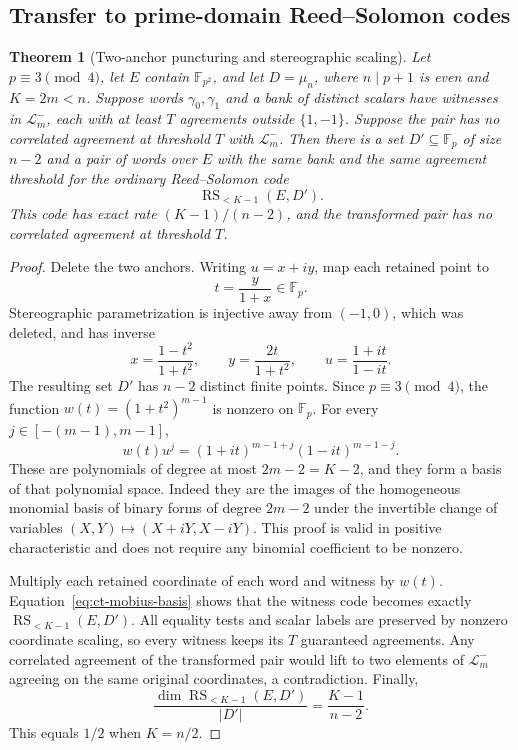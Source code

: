 \documentclass[11pt,letterpaper]{article}
\newtheorem{theorem}{Theorem}[section]
\theoremstyle{definition}
\theoremstyle{remark}
\begin{document}
\subsection{Transfer to prime-domain Reed--Solomon codes}
\label{sec:ct-stereographic}

\begin{theorem}[Two-anchor puncturing and stereographic scaling]
\label{thm:ct-transfer}
Let $p\equiv3\pmod4$, let $E$ contain $\mathbb F_{p^2}$, and let
$D=\mu_n$, where $n\mid p+1$ is even and $K=2m<n$. Suppose words $\gamma_0,\gamma_1$ and a bank
of distinct scalars have witnesses in $\mathcal L^-_m$, each with at
least $T$ agreements outside $\{1,-1\}$. Suppose the pair has no
correlated agreement at threshold $T$ with $\mathcal L^-_m$.
Then there is a set $D'\subseteq\mathbb F_p$ of size $n-2$ and a pair
of words over $E$ with the same bank and the same agreement threshold
for the ordinary Reed--Solomon code
\[
 \operatorname{RS}_{<K-1}(E,D').
\]
This code has exact rate $(K-1)/(n-2)$, and the transformed pair has no
correlated agreement at threshold $T$.
\end{theorem}

\begin{proof}
Delete the two anchors. Writing $u=x+iy$, map each retained point to
\[
 t=\frac{y}{1+x}\in\mathbb F_p.
\]
Stereographic parametrization is injective away from $(-1,0)$, which was
deleted, and has inverse
\[
 x=\frac{1-t^2}{1+t^2},\qquad
 y=\frac{2t}{1+t^2},\qquad
 u=\frac{1+it}{1-it}.
\]
The resulting set $D'$ has $n-2$ distinct finite points. Since $p\equiv3
\pmod4$, the function $w(t)=(1+t^2)^{m-1}$ is nonzero on $\mathbb F_p$.
For every $j\in[-(m-1),m-1]$,
\begin{equation}\label{eq:ct-mobius-basis}
 w(t)u^j=(1+it)^{m-1+j}(1-it)^{m-1-j}.
\end{equation}
These are polynomials of degree at most $2m-2=K-2$, and they form a
basis of that polynomial space. Indeed they are the images of the
homogeneous monomial basis of binary forms of degree $2m-2$ under the
invertible change of variables $(X,Y)\mapsto(X+iY,X-iY)$. This proof is
valid in positive characteristic and does not require any binomial
coefficient to be nonzero.

Multiply each retained coordinate of each word and witness by $w(t)$.
Equation~\eqref{eq:ct-mobius-basis} shows that the witness code becomes
exactly $\operatorname{RS}_{<K-1}(E,D')$. All equality tests and scalar
labels are preserved by nonzero coordinate scaling, so every witness
keeps its $T$ guaranteed agreements. Any correlated agreement of the
transformed pair would lift to two elements of $\mathcal L^-_m$ agreeing
on the same original coordinates, a contradiction. Finally,
\[
 \frac{\dim\operatorname{RS}_{<K-1}(E,D')}{|D'|}
 =\frac{K-1}{n-2}.
\]
This equals $1/2$ when $K=n/2$.
\end{proof}
\end{document}

